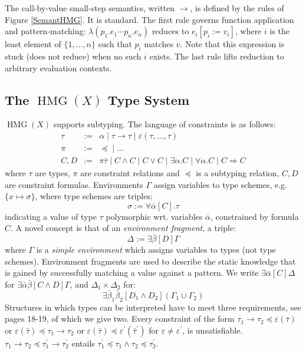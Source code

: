 \documentclass{article}
\newcommand{\assign}{:=}
\newcommand{\tmem}[1]{{\em #1\/}}
\newcommand{\tmop}[1]{\ensuremath{\operatorname{#1}}}
\begin{document}
The call-by-value small-step semantics, written $\rightarrow$, is defined by
the rules of Figure \ref{SemantHMG}. It is standard. The first rule governs
function application and pattern-matching: $\lambda (p_1 .e_1 \cdots p_n
.e_n)$ reduces to $e_i [p_i \assign v_i]$, where $i$ is the least element of
$\{ 1, \ldots, n \}$ such that $p_i$ matches $v$. Note that this expression is
stuck (does not reduce) when no such $i$ exists. The last rule lifts reduction
to arbitrary evaluation contexts.

\subsection{The $\tmop{HMG} (X)$ Type System}

$\tmop{HMG} (X)$ supports subtyping. The language of constraints is as
follows:
\begin{eqnarray*}
  \tau & \assign & \alpha \; | \; \tau \rightarrow \tau \; | \; \varepsilon
  (\tau, \ldots, \tau)\\
  \pi & \assign & \preccurlyeq \; | \; \ldots\\
  C, D & \assign & \pi \bar{\tau} \; | \; C \wedge C \; | \; C \vee C \; | \;
  \exists \alpha .C \; | \; \forall \alpha .C \; | \; C \Rightarrow C
\end{eqnarray*}
where $\tau$ are types, $\pi$ are constraint relations and $\preccurlyeq$ is a
subtyping relation, $C, D$ are constraint formulas. Environments $\Gamma$
assign variables to type schemes, e.g. $\{ x \mapsto \sigma \}$, where type
schemes are triples:
\[ \sigma \assign \forall \bar{\alpha} [C] . \tau \]
indicating a value of type $\tau$ polymorphic wrt. variables $\bar{\alpha}$,
constrained by formula $C$. A novel concept is that of an {\tmem{environment
fragment}}, a triple:
\[ \Delta \assign \exists \bar{\beta} [D] \Gamma \]
where $\Gamma$ is a {\tmem{simple environment}} which assigns variables to
types (not type schemes). Environment fragments are used to describe the
static knowledge that is gained by successfully matching a value against a
pattern. We write $\exists \bar{\alpha} [C] \Delta$ for $\exists \bar{\alpha}
\bar{\beta} [C \wedge D] \Gamma$, and $\Delta_1 \times \Delta_2$ for:
\[ \exists \bar{\beta}_1 \bar{\beta}_2 [D_1 \wedge D_2] (\Gamma_1 \cup
   \Gamma_2) \]
Structures in which types can be interpreted have to meet three requirements,
see {\cite{simonet-pottier-hmg-toplas}} pages 18-19, of which we give two.
Every constraint of the form $\tau_1 \rightarrow \tau_2 \preccurlyeq
\varepsilon (\bar{\tau})$ or $\varepsilon (\bar{\tau}) \preccurlyeq \tau_1
\rightarrow \tau_2$ or $\varepsilon (\bar{\tau}) \preccurlyeq
\varepsilon^{\prime} (\bar{\tau}^{\prime})$ for $\varepsilon \neq
\varepsilon^{\prime}$, is unsatisfiable. $\tau_1 \rightarrow \tau_2
\preccurlyeq \tau_1^{\prime} \rightarrow \tau_2^{\prime}$ entails
$\tau_1^{\prime} \preccurlyeq \tau_1 \wedge \tau_2 \preccurlyeq
\tau_2^{\prime}$.
\end{document}
